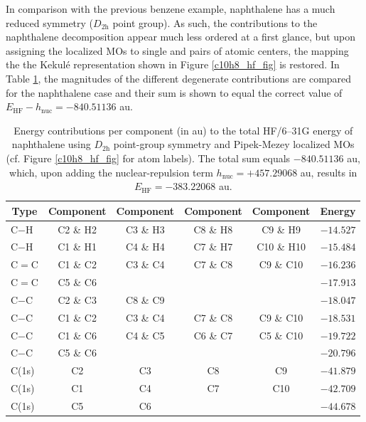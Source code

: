 \documentclass[journal=jctc,manuscript=article]{achemso}
\begin{document}
In comparison with the previous benzene example, naphthalene has a much reduced symmetry ($D_{2\text{h}}$ point group). As such, the contributions to the naphthalene decomposition appear much less ordered at a first glance, but upon assigning the localized MOs to single and pairs of atomic centers, the mapping the the Kekul{\'e} representation shown in Figure \ref{c10h8_hf_fig} is restored. In Table \ref{c10h8_hf_table}, the magnitudes of the different degenerate contributions are compared for the naphthalene case and their sum is shown to equal the correct value of $E_{\text{HF}} - h_{\text{nuc}} = -840.51136$ au.
%
\begin{table}[ht]
\begin{center}
\begin{tabular}{l|cccc|r}
\toprule
\multicolumn{1}{c|}{Type} & \multicolumn{1}{c}{Component} & \multicolumn{1}{c}{Component} & \multicolumn{1}{c}{Component} & \multicolumn{1}{c|}{Component} & \multicolumn{1}{c}{Energy} \\
\midrule\midrule
C$-$H & C2 \& H2 & C3 \& H3 & C8 \& H8 & C9 \& H9 & $-14.527$ \\
C$-$H & C1 \& H1 & C4 \& H4 & C7 \& H7 & C10 \& H10 & $-15.484$ \\
C$=$C & C1 \& C2 & C3 \& C4 & C7 \& C8 & C9 \& C10 & $-16.236$ \\
C$=$C & C5 \& C6 & & & & $-17.913$ \\
C$-$C & C2 \& C3 & C8 \& C9 & & & $-18.047$ \\
C$-$C & C1 \& C2 & C3 \& C4 & C7 \& C8 & C9 \& C10 & $-18.531$ \\
C$-$C & C1 \& C6 & C4 \& C5 & C6 \& C7 & C5 \& C10 & $-19.722$ \\
C$-$C & C5 \& C6 & & & & $-20.796$ \\
C(1s) & C2 & C3 & C8 & C9 & $-41.879$ \\
C(1s) & C1 & C4 & C7 & C10 & $-42.709$ \\
C(1s) & C5 & C6 & & & $-44.678$ \\
\bottomrule
\end{tabular}
\end{center}
\caption{Energy contributions per component (in au) to the total HF/6--31G energy of naphthalene using $D_{2\text{h}}$ point-group symmetry and Pipek-Mezey localized MOs (cf. Figure \ref{c10h8_hf_fig} for atom labels). The total sum equals $-840.51136$ au, which, upon adding the nuclear-repulsion term $h_{\text{nuc}} = +457.29068$ au, results in $E_{\text{HF}} = -383.22068$ au.}
\label{c10h8_hf_table}
\end{table}
%
\end{document}
